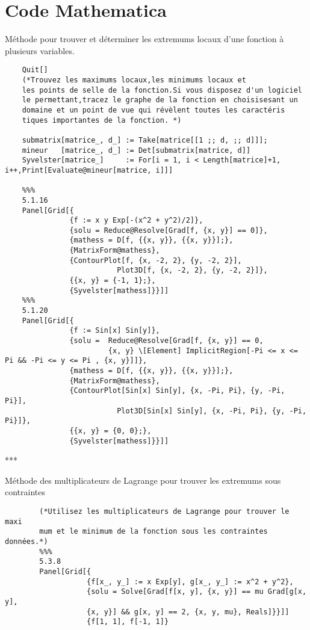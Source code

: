 \section{Code Mathematica}
	\begin{center}
		Méthode pour trouver et déterminer les extremums locaux d'une fonction à plusieurs variables.
	\end{center}
	\begin{verbatim}
	Quit[]
	(*Trouvez les maximums locaux,les minimums locaux et
	les points de selle de la fonction.Si vous disposez d'un logiciel
	le permettant,tracez le graphe de la fonction en choisisesant un 
	domaine et un point de vue qui révèlent toutes les caractéris­
	tiques importantes de la fonction. *)
	
	submatrix[matrice_, d_] := Take[matrice[[1 ;; d, ;; d]]];
	mineur   [matrice_, d_] := Det[submatrix[matrice, d]]	
	Syvelster[matrice_]     := For[i = 1, i < Length[matrice]+1, i++,Print[Evaluate@mineur[matrice, i]]]
	
	%%%
	5.1.16
	Panel[Grid[{
	           {f := x y Exp[-(x^2 + y^2)/2]},
	           {solu = Reduce@Resolve[Grad[f, {x, y}] == 0]},
	           {mathess = D[f, {{x, y}}, {{x, y}}];},
	           {MatrixForm@mathess},
	           {ContourPlot[f, {x, -2, 2}, {y, -2, 2}], 
	                      Plot3D[f, {x, -2, 2}, {y, -2, 2}]},
	           {{x, y} = {-1, 1};},
	           {Syvelster[mathess]}}]]
	%%%
	5.1.20
	Panel[Grid[{
	           {f := Sin[x] Sin[y]},
	           {solu =	Reduce@Resolve[Grad[f, {x, y}] == 0,
	           			{x, y} \[Element] ImplicitRegion[-Pi <= x <= Pi && -Pi <= y <= Pi , {x, y}]]},
	           {mathess = D[f, {{x, y}}, {{x, y}}];},
	           {MatrixForm@mathess},
	           {ContourPlot[Sin[x] Sin[y], {x, -Pi, Pi}, {y, -Pi, Pi}], 
	                      Plot3D[Sin[x] Sin[y], {x, -Pi, Pi}, {y, -Pi, Pi}]},
	           {{x, y} = {0, 0};},
	           {Syvelster[mathess]}}]]
	\end{verbatim}
	
	\begin{center}***\end{center}
	
	\begin{center}
		Méthode des multiplicateurs de Lagrange pour trouver les extremums sous contraintes 
	\end{center}
	\begin{verbatim}
		(*Utilisez les multiplicateurs de Lagrange pour trouver le maxi­
		mum et le minimum de la fonction sous les contraintes données.*)
		%%%
		5.3.8
		Panel[Grid[{
		           {f[x_, y_] := x Exp[y], g[x_, y_] := x^2 + y^2},
		           {solu = Solve[Grad[f[x, y], {x, y}] == mu Grad[g[x, y], 
		           {x, y}] && g[x, y] == 2, {x, y, mu}, Reals]}}]]
		           {f[1, 1], f[-1, 1]}
	\end{verbatim}
	

